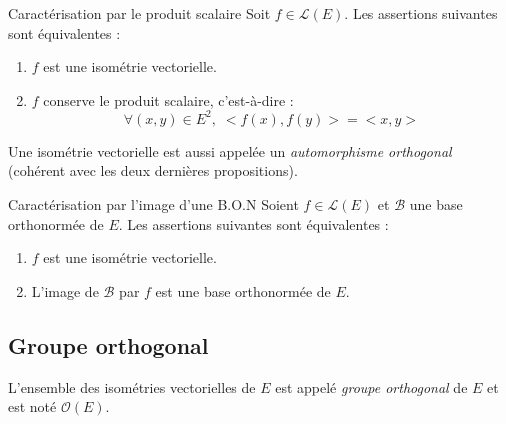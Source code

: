\documentclass[french,11pt,twoside]{VcCours}
\begin{document}
\begin{Demonstration}{}

\vspace*{2.5cm}
\end{Demonstration}

\begin{Proposition}{Caractérisation par le produit scalaire}
Soit $f \in \mathcal{L}(E)$. Les assertions suivantes sont équivalentes :
\begin{enumerate}
\item $f$ est une isométrie vectorielle.
\item $f$ conserve le produit scalaire, c'est-à-dire :
$$ \forall (x,y) \in E^2, \; <f(x),f(y)>=<x,y> $$
\end{enumerate}
\end{Proposition}

\begin{Remarque}{} Une isométrie vectorielle est aussi appelée un \emph{automorphisme orthogonal} (cohérent avec les deux dernières propositions).
\end{Remarque}

\begin{Demonstration}{}
\vspace*{7cm}
\end{Demonstration}

\begin{Proposition}{Caractérisation par l'image d'une B.O.N}
Soient $f \in \mathcal{L}(E)$ et $\mathcal{B}$ une base orthonormée de $E$. Les assertions suivantes sont équivalentes :
\begin{enumerate}
\item $f$ est une isométrie vectorielle.
\item L'image de $\mathcal{B}$ par $f$ est une base orthonormée de $E$.
\end{enumerate}
\end{Proposition}

\begin{Demonstration}{}
\vspace*{7cm}
\end{Demonstration}

\subsection{Groupe orthogonal}

\begin{Definition}{} L'ensemble des isométries vectorielles de $E$ est appelé \emph{groupe orthogonal} de $E$ et est noté $\mathcal{O}(E)$. 
\end{Definition}
\end{document}
